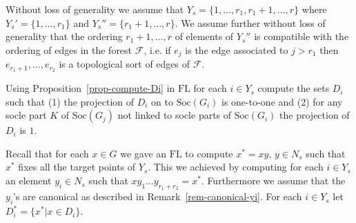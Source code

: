\documentclass[11pt]{madras}%
\theoremstyle{remark}
\newcommand{\Soc}[1]{{\ensuremath{\mathrm{Soc}\left(#1\right)}}}
\begin{document}
Without loss of generality we assume that $Y_s = \{1,\ldots, r_1 ,
r_1+1, \ldots , r \}$ where $Y_s' = \{ 1, \ldots, r_1\}$ and $Y_s'' =
\{ r_1 +1, \ldots, r \}$. We assume further without loss of generality
that the ordering $r_1 +1,\ldots,r$ of elements of $Y_s''$ is
compatible with the ordering of edges in the forest $\mathcal{F}$,
i.e. if $e_j$ is the edge associated to $j > r_1$ then $e_{r_1 +
  1},\ldots,e_{r_2}$ is a topological sort of edges of $\mathcal{F}$.

Using Proposition~\ref{prop-compute-Di} in $\mathrm{FL}$ for each $i
\in Y_s$ compute the sets $D_i$ such that (1) the projection of $D_i$
on to $\Soc{G_i}$ is one-to-one and (2) for any socle part $K$ of
$\Soc{G_j}$ not linked to socle parts of $\Soc{G_i}$ the projection of
$D_i$ is $1$. 

Recall that for each $x \in G$ we gave an $\mathrm{FL}$ to compute
$x^* = xy$, $y \in N_s$ such that $x^*$ fixes all the target points of
$Y_s$. This we achieved by computing for each $i \in Y_s$ an element
$y_i \in N_s$ such that $x y_1 \ldots y_{r_1+r_2} = x^*$. Furthermore
we assume that the $y_i$'s are canonical as described in
Remark~\ref{rem-canonical-yi}.  For each $i \in Y_s$ let $D_i^* = \{
x^* | x \in D_i \}$.
\end{document}
